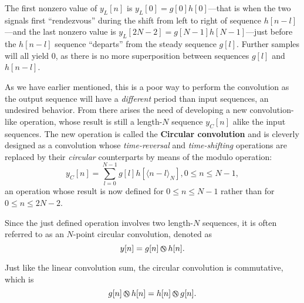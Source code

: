 \documentclass[\documentfontsize, twocolumn]{\classname}
\begin{document}
The first nonzero value of $y_L[n]$ is $y_L[0] = g[0]h[0]$---that is when the two signals first ``rendezvous'' during the shift from left to right of sequence $h[n-l]$---and the last nonzero value is $y_L[2N-2] = g[N-1]h[N-1]$---just before the $h[n-l]$ sequence ``departs'' from the steady sequence $g[l]$. Further samples will all yield $0$, as there is no more superposition between sequences $g[l]$ and $h[n-l]$.

As we have earlier mentioned, this is a poor way to perform the convolution as the output sequence will have a \emph{different} period than input sequences, an undesired behavior. From there arises the need of developing a new convolution-like operation, whose result is still a length-$N$ sequence $y_C[n]$ alike the input sequences. The new operation is called the \textbf{Circular convolution} and is cleverly designed as a convolution whose \emph{time-reversal} and \emph{time-shifting} operations are replaced by their \emph{circular} counterparts by means of the modulo operation:
\begin{equation}\label{eqn:circularConvolution}
    y_C[n] = \sum_{l=0}^{N-1} g[l]h[\langle n-l \rangle_N], 0 \leq n \leq N-1,
\end{equation}
an operation whose result is now defined for $0 \leq n \leq N-1$ rather than for $0 \leq n \leq 2N-2$.

Since the just defined operation involves two length-$N$ sequences, it is often referred to as an $N$-point circular convolution, denoted as
\begin{equation}\label{eqn:circularConvolutionSymbol}
    y[n] = g[n] \encircle{N}  h[n].
\end{equation}

Just like the linear convolution sum, the circular convolution is commutative, which is
\[
    g[n] \encircle{N} h[n] = h[n] \encircle{N} g[n].
\]
\end{document}
